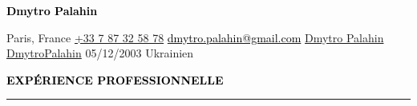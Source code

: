 \documentclass[10pt,english,french]{article}
\newcommand{\linkedinIcon}[1][black]{\textcolor{#1}{\faLinkedin}}
\newcommand{\githubIcon}[1][black]{\textcolor{#1}{\faGithub}}
\newcommand{\emailIcon}[1][black]{\textcolor{#1}{\faEnvelope}}
\newcommand{\emailLink}[2][black]{\href{mailto:#2}{\emailIcon[black] \textcolor{#1}{#2}}}
\newcommand{\locationIcon}[1][black]{\textcolor{#1}{\faMapMarker}}
\newcommand{\phoneIcon}[1][black]{\textcolor{#1}{\faPhone}}
\newcommand{\birthdayIcon}[1][black]{\textcolor{#1}{\faUser}}
\newcommand{\nationalityIcon}[1][black]{\textcolor{#1}{\faGlobe}}
\newcommand{\cvsection}[1]{
    \vspace{4pt}
    \textbf{\fontsize{9pt}{10pt}\selectfont \textcolor{black}{#1}}
    \vspace{6pt}
    \hrule
    \vspace{6pt}
}
\begin{document}
\sloppy             %
\hfuzz=10000pt      %

\noindent
\begin{minipage}[c]{0.86\textwidth}
    \begin{center}
        \textbf{\textcolor{black}{\fontsize{17pt}{12pt}\selectfont Dmytro Palahin}}
    \end{center}
    \vspace{-16pt}
    \begin{center}
        {\fontsize{9pt}{11pt}\selectfont
            \locationIcon[black]\hspace{3pt}Paris, France\hspace{18pt}
            \href{tel:+33787325878}{\phoneIcon[black]\hspace{3pt}+33 7 87 32 58 78}\hspace{18pt}
            \emailLink[black]{dmytro.palahin@gmail.com}\hspace{18pt}
            \linkedinIcon[black]\hspace{3pt}\href{https://www.linkedin.com/in/dmytro-palahin/}{Dmytro Palahin}\hspace{18pt}
            \githubIcon[black]\hspace{3pt}\href{https://github.com/DmytroPalahin}{DmytroPalahin}\hspace{18pt}
            \birthdayIcon[black]\hspace{3pt}05/12/2003\hspace{18pt}
            \nationalityIcon[black]\hspace{3pt}Ukrainien
        }
    \end{center}
\end{minipage}%
\hspace{3pt}
\begin{minipage}[c]{0.11\textwidth}
    \vspace{-12pt}
    \raggedleft{}
\end{minipage}

\vspace{-5pt}
\cvsection{EXPÉRIENCE PROFESSIONNELLE}
\end{document}
